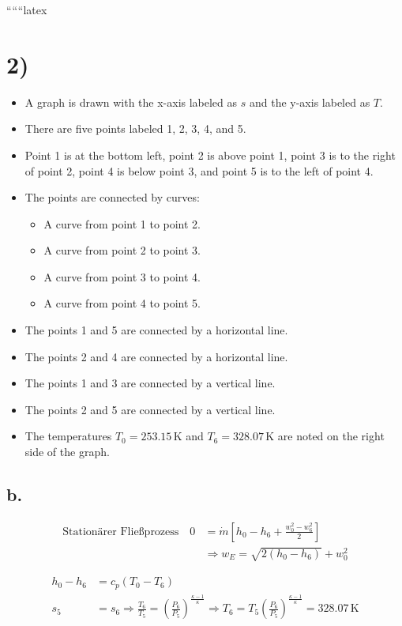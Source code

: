 
``````latex


\section*{2)}

\begin{itemize}
    \item A graph is drawn with the x-axis labeled as $s$ and the y-axis labeled as $T$. 
    \item There are five points labeled 1, 2, 3, 4, and 5.
    \item Point 1 is at the bottom left, point 2 is above point 1, point 3 is to the right of point 2, point 4 is below point 3, and point 5 is to the left of point 4.
    \item The points are connected by curves: 
        \begin{itemize}
            \item A curve from point 1 to point 2.
            \item A curve from point 2 to point 3.
            \item A curve from point 3 to point 4.
            \item A curve from point 4 to point 5.
        \end{itemize}
    \item The points 1 and 5 are connected by a horizontal line.
    \item The points 2 and 4 are connected by a horizontal line.
    \item The points 1 and 3 are connected by a vertical line.
    \item The points 2 and 5 are connected by a vertical line.
    \item The temperatures $T_0 = 253.15 \, \text{K}$ and $T_6 = 328.07 \, \text{K}$ are noted on the right side of the graph.
\end{itemize}

\subsection*{b.}

\begin{align*}
\text{Stationärer Fließprozess} \quad 0 &= \dot{m} \left[ h_0 - h_6 + \frac{w_0^2 - w_6^2}{2} \right] \\
&\Rightarrow w_E = \sqrt{2 (h_0 - h_6)} + w_0^2
\end{align*}

\begin{align*}
h_0 - h_6 &= c_p (T_0 - T_6) \\
s_5 &= s_6 \Rightarrow \frac{T_6}{T_5} = \left( \frac{P_6}{P_5} \right)^{\frac{\kappa - 1}{\kappa}} \Rightarrow T_6 = T_5 \left( \frac{P_6}{P_5} \right)^{\frac{\kappa - 1}{\kappa}} = 328.07 \, \text{K}
\end{align*}


